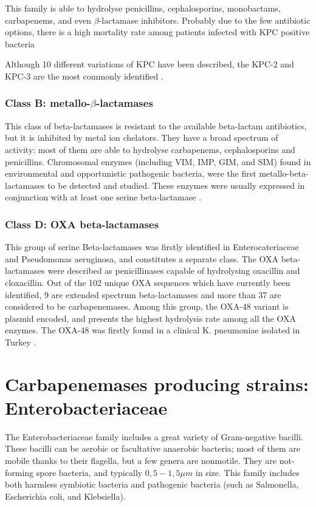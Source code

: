 \documentclass[11pt]{report}
\begin{document}
This family is able to hydrolyse penicillins, cephalosporins, monobactams, carbapenems, and even $\beta$-lactamase inhibitors.
Probably due to the few antibiotic options, there is a high mortality rate among patients infected with KPC positive bacteria \cite{MunozPrice2013}

Although 10 different variations of KPC have been described, the KPC-2 and KPC-3 are the most commonly identified \cite{WaltherRasmussen2007}.

\subsection {Class B: metallo-$\beta$-lactamases}
This class of beta-lactamases is resistant to the available beta-lactam antibiotics, but it is inhibited by metal ion chelators.
They have a broad spectrum of activity: most of them are able to hydrolyse carbapenems, cephalosporins and penicillins.
Chromosomal enzymes (including VIM, IMP, GIM, and SIM) found in environmental and opportunistic pathogenic bacteria, were the first metallo-beta-lactamases to be detected and studied.
These enzymes were usually expressed in conjunction with at least one serine beta-lactamase \cite{Queenan2007}.

\subsection{Class D: OXA beta-lactamases}
This group of serine Beta-lactamases was firstly identified in Enterocateriaceae and Pseudomonas aeruginosa, and constitutes a separate class.
The OXA beta-lactamases were described as penicillinases capable of hydrolysing oxacillin and cloxacillin.
Out of the 102 unique OXA sequences which have currently been identified, 9 are extended spectrum beta-lactamases and more than 37 are considered to be carbapenemases.
Among this group, the OXA-48 variant is plasmid encoded, and presents the highest hydrolysis rate among all the OXA enzymes.
The OXA-48 was firstly found in a clinical K. pneumoniae isolated in Turkey \cite{Poirel2012}.

\chapter{Carbapenemases producing strains: Enterobacteriaceae}
The Enterobacteriaceae family includes a great variety of Gram-negative bacilli.
These bacilli can be aerobic or facultative anaerobic bacteria; most of them are mobile thanks to their flagella, but a few genera are nonmotile.
They are not-forming spore bacteria, and typically $0,5-1,5\mu m$ in size.
This family includes both harmless symbiotic bacteria and pathogenic bacteria (such as Salmonella, Escherichia coli, and Klebsiella).
\end{document}
